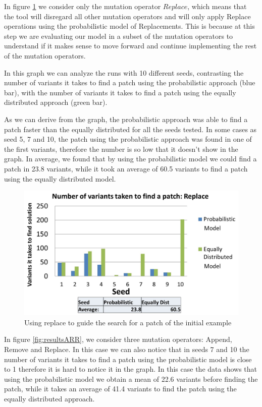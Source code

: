 \documentclass[conference]{IEEEtran}
\begin{document}
In figure \ref{fig:resultsReplace} we consider only the mutation operator 
$Replace$, which means that the tool will disregard all other mutation 
operators and will only apply Replace operations using the probabilistic model 
of Replacements. This is because at this step we are evaluating our model in a 
subset of the mutation operators to understand if it makes sense to move forward and 
continue implementing the rest of the mutation operators.

In this graph we can analyze the runs with 10 different seeds, contrasting the 
number of variants it takes to find a patch using the probabilistic approach 
(blue bar), with the number of variants it takes to find a patch using the 
equally distributed approach (green bar). 

As we can derive from the graph, the probabilistic approach was able to find a 
patch faster than the equally distributed for all the seeds tested. In some 
cases as seed 5, 7 and 10, the patch using the probabilistic approach was found 
in one of the first variants, therefore the number is so low that it doesn't 
show in the graph. In average, we found that by using the probabilistic model we 
could find a patch in 23.8 variants, while it took an average of 60.5 variants 
to find a patch using the equally distributed model.

\begin{figure}[!h]
  \centering
    \includegraphics[scale=0.25]{sanity3}
  \caption{Using replace to guide the search for a patch of the initial example}
  \label{fig:resultsReplace}
\end{figure}

In figure \ref{fig:resultsARR}, we consider three mutation operators: Append, 
Remove and Replace. In this case we can also notice that in seeds 7 and 10 the 
number of variants it takes to find a patch using the probabilistic model is 
close to 1 therefore it is hard to notice it in the graph. In this case the data 
shows that using the probabilistic model we obtain a mean of 22.6 variants 
before finding the patch, while it takes an average of 41.4 variants to find the 
patch using the equally distributed approach.
\end{document}
